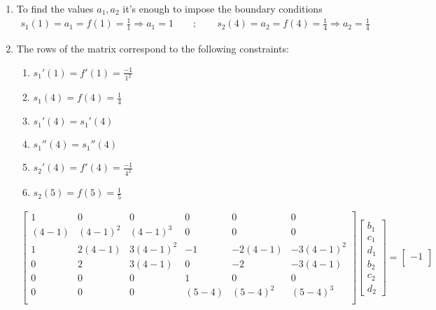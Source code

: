 \documentclass{article}
\begin{document}
    \begin{enumerate}[label=(\roman*)]
        \item To find the values $a_1,a_2$ it's enough to impose the boundary conditions
        \begin{align}
            s_1(1)=a_1 = f(1)=\frac{1}{1} \Longrightarrow a_1 = 1 \qquad ; \qquad s_2(4)=a_2=f(4)=\frac{1}{4} \Longrightarrow a_2 = \frac{1}{4}
        \end{align}
        \item The rows of the matrix correspond to the following constraints:
        \begin{enumerate}[label=\arabic*.]
            \item $s_1'(1)=f'(1)=\frac{-1}{1^2}$
            \item $s_1(4)=f(4)=\frac{1}{4}$
            \item $s_1'(4)=s_1'(4)$
            \item $s_1''(4)=s_1''(4)$
            \item $s_2'(4)=f'(4)=\frac{-1}{4^2}$
            \item $s_2(5)=f(5)=\frac{1}{5}$
        \end{enumerate}
        \begin{align}
            \begin{bmatrix}
            1 & 0 & 0 & 0 & 0 & 0 \\
            (4-1) & (4-1)^2 & (4-1)^3 & 0 & 0 & 0\\
             1 & 2(4-1) & 3(4-1)^2 & -1 & -2(4-1) & -3(4-1)^2 \\
            0 & 2 & 3(4-1) & 0 & -2 & -3(4-1) \\
            0 & 0 & 0 & 1 & 0 & 0 \\
            0 & 0 & 0 & (5-4) & (5-4)^2 & (5-4)^3 \\
            \end{bmatrix}
            \begin{bmatrix}
                b_1 \\
                c_1 \\
                d_1 \\
                b_2 \\
                c_2 \\
                d_2
            \end{bmatrix}
            =
            \begin{bmatrix}
                -1 \\

\end{bmatrix}
\end{align}
\end{enumerate}
\end{document}
